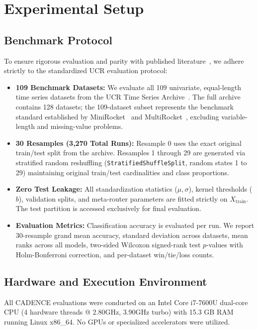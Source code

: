 \documentclass[journal,twocolumn]{article}
\begin{document}
\section{Experimental Setup}

\subsection{Benchmark Protocol}
To ensure rigorous evaluation and parity with published literature~\cite{middlehurst2021hive,dempster2023hydra}, we adhere strictly to the standardized UCR evaluation protocol:
\begin{itemize}
    \item \textbf{109 Benchmark Datasets:} We evaluate all 109 univariate, equal-length time series datasets from the UCR Time Series Archive~\cite{dau2019ucr,dempster2021minirocket}. The full archive contains 128 datasets; the 109-dataset subset represents the benchmark standard established by MiniRocket~\cite{dempster2021minirocket} and MultiRocket~\cite{tan2022multirocket}, excluding variable-length and missing-value problems.
    \item \textbf{30 Resamples (3,270 Total Runs):} Resample 0 uses the exact original train/test split from the archive. Resamples 1 through 29 are generated via stratified random reshuffling (\texttt{StratifiedShuffleSplit}, random states 1 to 29) maintaining original train/test cardinalities and class proportions.
    \item \textbf{Zero Test Leakage:} All standardization statistics ($\mu, \sigma$), kernel thresholds ($b$), validation splits, and meta-router parameters are fitted strictly on $X_{\text{train}}$. The test partition is accessed exclusively for final evaluation.
    \item \textbf{Evaluation Metrics:} Classification accuracy is evaluated per run. We report 30-resample grand mean accuracy, standard deviation across datasets, mean ranks across all models, two-sided Wilcoxon signed-rank test $p$-values with Holm-Bonferroni correction, and per-dataset win/tie/loss counts.
\end{itemize}

\subsection{Hardware and Execution Environment}
All CADENCE evaluations were conducted on an Intel Core i7-7600U dual-core CPU (4 hardware threads @ 2.80GHz, 3.90GHz turbo) with 15.3 GB RAM running Linux x86\_64. No GPUs or specialized accelerators were utilized.
\end{document}
